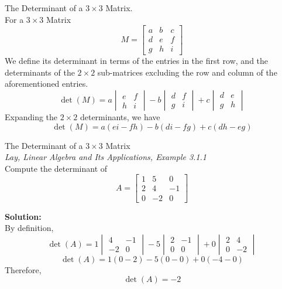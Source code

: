 \documentclass[11pt]{article}
\theoremstyle{gangnamstyle}{\newtheorem{definition}{Definition}[]}
\theoremstyle{gangnamstyle}{\newtheorem{example}{Example}[]}
\theoremstyle{gangnamstyle}{\newtheorem{problem}{Problem}[]}
\begin{document}
\begin{definition}
The Determinant of a $3 \times 3$ Matrix. \\
For a $3 \times 3$ Matrix
\begin{equation}
M = 
\begin{bmatrix}
a & b & c \\
d & e & f \\
g & h & i
\end{bmatrix}
\end{equation}
We define its determinant in terms of the entries in the first row, and the determinants of the $2 \times 2$ sub-matrices excluding the row and column of the aforementioned entries. 
\begin{equation}
\det(M) = 
a 
\begin{vmatrix}
e & f \\
h & i 
\end{vmatrix}
- b 
\begin{vmatrix}
d & f \\
g & i 
\end{vmatrix}
+c
\begin{vmatrix}
d & e \\
g & h 
\end{vmatrix}
\end{equation}
Expanding the $2 \times 2$ determinants, we have
\begin{equation}
\det(M) = a(ei - fh) - b(di - fg) + c(dh - eg)
\end{equation}
\end{definition}

\begin{example}
The Determinant of a $3 \times 3$ Matrix \\
\textit{Lay, Linear Algebra and Its Applications, Example 3.1.1} \\
Compute the determinant of
\[ A = 
\begin{bmatrix}
1 & 5 & 0 \\
2 & 4 & -1 \\
0 & -2 & 0
\end{bmatrix} \]

\textbf{Solution:} \\
By definition, 
\[ \det(A) = 
1
\begin{vmatrix}
4 & -1 \\
-2 & 0 
\end{vmatrix}
- 5 
\begin{vmatrix}
2 & -1 \\
0 & 0
\end{vmatrix}
+ 0
\begin{vmatrix}
2 & 4 \\
0 & -2
\end{vmatrix}\]
\[ \det(A) = 1(0 - 2) - 5(0 - 0) + 0(-4 - 0) \]
Therefore, 
\[ \det(A) = -2 \]
\end{example}
\end{document}

